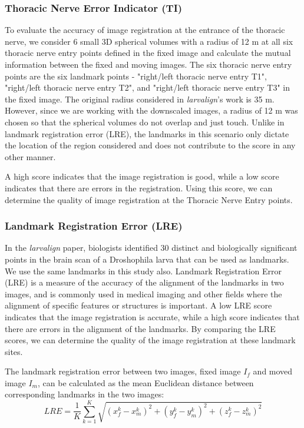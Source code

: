\documentclass{book}
\begin{document}
	\subsubsection{Thoracic Nerve Error Indicator (TI)} \label{subsubsec:ti}
	To evaluate the accuracy of image registration at the entrance of the thoracic nerve, we consider 6 small 3D spherical volumes with a radius of 12 \textmu m at all six thoracic nerve entry points defined in the fixed image and calculate the mutual information between the fixed and moving images. The six thoracic nerve entry points are the six landmark points - "right/left thoracic nerve entry T1",  "right/left thoracic nerve entry T2", and "right/left thoracic nerve entry T3" in the fixed image. The original radius considered in \textit{larvalign}'s work \cite{larvalign} is 35 \textmu m. However, since we are working with the downscaled images, a radius of 12 \textmu m was chosen so that the spherical volumes do not overlap and just touch. Unlike in landmark registration error (LRE), the landmarks in this scenario only dictate the location of the region considered and does not contribute to the score in any other manner.
	
	A high score indicates that the image registration is good, while a low score indicates that there are errors in the registration. Using this score, we can determine the quality of image registration at the Thoracic Nerve Entry points.
	
	\subsubsection{Landmark Registration Error (LRE)}
	In the \textit{larvalign} paper, biologists identified 30 distinct and biologically significant points in the brain scan of a Droshophila larva that can be used as landmarks. We use the same landmarks in this study also. Landmark Registration Error (LRE) is a measure of the accuracy of the alignment of the landmarks in two images, and is commonly used in medical imaging and other fields where the alignment of specific features or structures is important. A low LRE score indicates that the image registration is accurate, while a high score indicates that there are errors in the alignment of the landmarks. By comparing the LRE scores, we can determine the quality of the image registration at these landmark sites.
	
	The landmark registration error between two images, fixed image $I_f$ and moved image $I_m$, can be calculated as the mean Euclidean distance between corresponding landmarks in the two images:
	\begin{equation}\label{eqn:lre}
		LRE = \frac{1}{K} \sum_{k=1}^K \sqrt{(x_f^k - x_m^k)^2 + (y_f^k - y_m^k)^2 + (z_f^k - z_m^k)^2}
	\end{equation}
	
\end{document}
